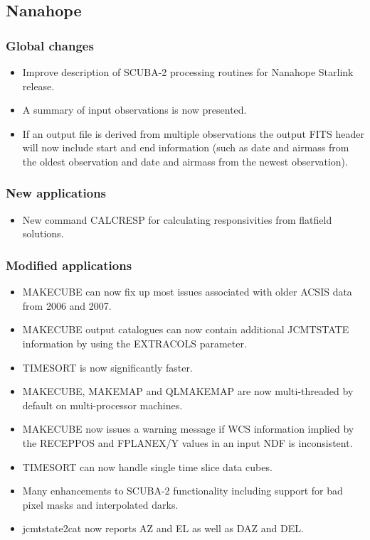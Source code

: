 \documentclass[oneside,11pt]{starlink}
\begin{document}
\subsection{Nanahope}

\subsubsection*{Global changes}
\begin{itemize}
\item Improve description of SCUBA-2 processing routines for Nanahope
  Starlink release.
\item A summary of input observations is now presented.
\item If an output file is derived from multiple observations the
  output FITS header will now include start and end information (such
  as date and airmass from the oldest observation and date and airmass
  from the newest observation).

\end{itemize}

\subsubsection*{New applications}
\begin{itemize}
  \item New command CALCRESP for calculating responsivities from
    flatfield solutions.
\end{itemize}

\subsubsection*{Modified applications}
\begin{itemize}
  \item MAKECUBE can now fix up most issues associated with older ACSIS data from 2006 and 2007.
  \item MAKECUBE output catalogues can now contain additional JCMTSTATE information by using the EXTRACOLS parameter.
  \item TIMESORT is now significantly faster.
  \item MAKECUBE, MAKEMAP and QLMAKEMAP are now multi-threaded by default on multi-processor machines.
  \item MAKECUBE now issues a warning message if WCS information implied by the RECEPPOS and FPLANEX/Y values in an input NDF is inconsistent.
  \item TIMESORT can now handle single time slice data cubes.
  \item Many enhancements to SCUBA-2 functionality including support for bad pixel masks and interpolated darks.
 \item jcmtstate2cat now reports AZ and EL as well as DAZ and DEL.
\end{itemize}
\end{document}

